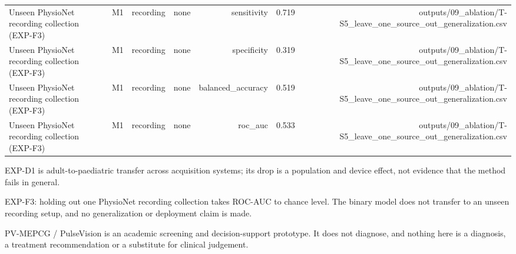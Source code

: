 \begin{table}[htbp]
\begin{tabular}{lrrrrrr}
    Unseen PhysioNet recording collection (EXP-F3) & M1 & recording & none & sensitivity & 0.719 & outputs/09\_ablation/T-S5\_leave\_one\_source\_out\_generalization.csv \\
    Unseen PhysioNet recording collection (EXP-F3) & M1 & recording & none & specificity & 0.319 & outputs/09\_ablation/T-S5\_leave\_one\_source\_out\_generalization.csv \\
    Unseen PhysioNet recording collection (EXP-F3) & M1 & recording & none & balanced\_accuracy & 0.519 & outputs/09\_ablation/T-S5\_leave\_one\_source\_out\_generalization.csv \\
    Unseen PhysioNet recording collection (EXP-F3) & M1 & recording & none & roc\_auc & 0.533 & outputs/09\_ablation/T-S5\_leave\_one\_source\_out\_generalization.csv \\
    \bottomrule
  \end{tabular}
  \par\footnotesize EXP-D1 is adult-to-paediatric transfer across acquisition systems; its drop is a population and device effect, not evidence that the method fails in general.
  \par\footnotesize EXP-F3: holding out one PhysioNet recording collection takes ROC-AUC to chance level. The binary model does not transfer to an unseen recording setup, and no generalization or deployment claim is made.
  \par\footnotesize PV-MEPCG / PulseVision is an academic screening and decision-support prototype. It does not diagnose, and nothing here is a diagnosis, a treatment recommendation or a substitute for clinical judgement.
\end{table}
